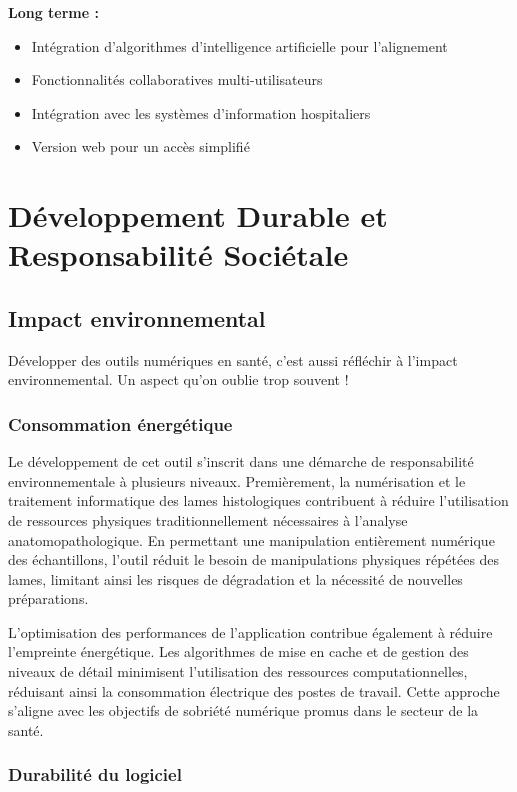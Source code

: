 \documentclass[11pt,a4paper]{report}
\begin{document}
\textbf{Long terme :}
\begin{itemize}
\item Intégration d'algorithmes d'intelligence artificielle pour l'alignement
\item Fonctionnalités collaboratives multi-utilisateurs
\item Intégration avec les systèmes d'information hospitaliers
\item Version web pour un accès simplifié
\end{itemize}

\chapter{Développement Durable et Responsabilité Sociétale}

\section{Impact environnemental}

Développer des outils numériques en santé, c'est aussi réfléchir à l'impact environnemental. Un aspect qu'on oublie trop souvent !

\subsection{Consommation énergétique}

Le développement de cet outil s'inscrit dans une démarche de responsabilité environnementale à plusieurs niveaux. Premièrement, la numérisation et le traitement informatique des lames histologiques contribuent à réduire l'utilisation de ressources physiques traditionnellement nécessaires à l'analyse anatomopathologique. En permettant une manipulation entièrement numérique des échantillons, l'outil réduit le besoin de manipulations physiques répétées des lames, limitant ainsi les risques de dégradation et la nécessité de nouvelles préparations.

L'optimisation des performances de l'application contribue également à réduire l'empreinte énergétique. Les algorithmes de mise en cache et de gestion des niveaux de détail minimisent l'utilisation des ressources computationnelles, réduisant ainsi la consommation électrique des postes de travail. Cette approche s'aligne avec les objectifs de sobriété numérique promus dans le secteur de la santé.

\subsection{Durabilité du logiciel}
\end{document}
